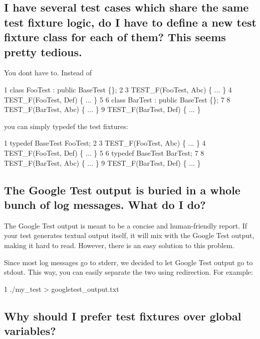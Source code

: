 \subsection*{I have several test cases which share the same test fixture logic, do I have to define a new test fixture class for each of them? This seems pretty tedious.}

You don\textquotesingle{}t have to. Instead of


\begin{DoxyCode}
1 class FooTest : public BaseTest \{\};
2 
3 TEST\_F(FooTest, Abc) \{ ... \}
4 TEST\_F(FooTest, Def) \{ ... \}
5 
6 class BarTest : public BaseTest \{\};
7 
8 TEST\_F(BarTest, Abc) \{ ... \}
9 TEST\_F(BarTest, Def) \{ ... \}
\end{DoxyCode}


you can simply {\ttfamily typedef} the test fixtures\+: 
\begin{DoxyCode}
1 typedef BaseTest FooTest;
2 
3 TEST\_F(FooTest, Abc) \{ ... \}
4 TEST\_F(FooTest, Def) \{ ... \}
5 
6 typedef BaseTest BarTest;
7 
8 TEST\_F(BarTest, Abc) \{ ... \}
9 TEST\_F(BarTest, Def) \{ ... \}
\end{DoxyCode}


\subsection*{The Google Test output is buried in a whole bunch of log messages. What do I do?}

The Google Test output is meant to be a concise and human-\/friendly report. If your test generates textual output itself, it will mix with the Google Test output, making it hard to read. However, there is an easy solution to this problem.

Since most log messages go to stderr, we decided to let Google Test output go to stdout. This way, you can easily separate the two using redirection. For example\+: 
\begin{DoxyCode}
1 ./my\_test > googletest\_output.txt
\end{DoxyCode}


\subsection*{Why should I prefer test fixtures over global variables?}

